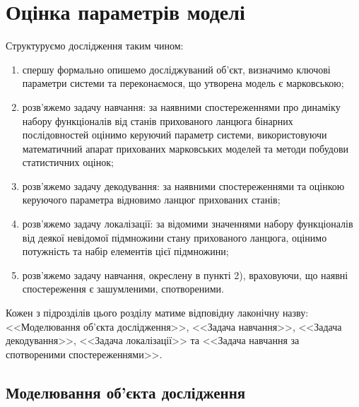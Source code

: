 \chapter{Оцінка параметрів моделі}
\label{chap: theory}

Структуруємо дослідження таким чином:

\begin{enumerate}
    \item спершу формально опишемо досліджуваний об'єкт, визначимо ключові параметри системи та переконаємося, що утворена модель є марковською;
    \item розв'яжемо задачу навчання: за наявними спостереженнями про динаміку набору функціоналів від станів прихованого ланцюга бінарних послідовностей оцінимо керуючий параметр системи, використовуючи математичний апарат прихованих марковських моделей та методи побудови статистичних оцінок;
    \item розв'яжемо задачу декодування: за наявними спостереженнями та оцінкою керуючого параметра відновимо ланцюг прихованих станів;
    \item розв'яжемо задачу локалізації: за відомими значеннями набору функціоналів від деякої невідомої підмножини стану прихованого ланцюга, оцінимо потужність та набір елементів цієї підмножини;
    \item розв'яжемо задачу навчання, окреслену в пункті 2), враховуючи, що наявні спостереження є зашумленими, спотвореними.
\end{enumerate}

Кожен з підрозділів цього розділу матиме відповідну лаконічну назву: <<Моделювання об'єкта дослідження>>, <<Задача навчання>>, <<Задача декодування>>, <<Задача локалізації>> та <<Задача навчання за спотвореними спостереженнями>>.

\section{Моделювання об'єкта дослідження}



